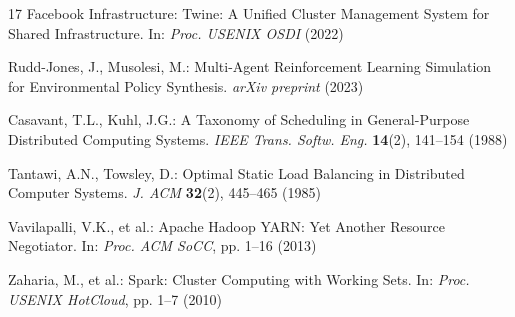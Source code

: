 \documentclass[runningheads]{llncs}
\begin{document}
\begin{thebibliography}{17}
Facebook Infrastructure: Twine: A Unified Cluster Management System for Shared Infrastructure. In: \emph{Proc. USENIX OSDI} (2022)

Rudd-Jones, J., Musolesi, M.: Multi-Agent Reinforcement Learning Simulation for Environmental Policy Synthesis. \emph{arXiv preprint} (2023)

Casavant, T.L., Kuhl, J.G.: A Taxonomy of Scheduling in General-Purpose Distributed Computing Systems. \emph{IEEE Trans. Softw. Eng.} \textbf{14}(2), 141--154 (1988)

Tantawi, A.N., Towsley, D.: Optimal Static Load Balancing in Distributed Computer Systems. \emph{J. ACM} \textbf{32}(2), 445--465 (1985)

Vavilapalli, V.K., et al.: Apache Hadoop YARN: Yet Another Resource Negotiator. In: \emph{Proc. ACM SoCC}, pp. 1--16 (2013)

Zaharia, M., et al.: Spark: Cluster Computing with Working Sets. In: \emph{Proc. USENIX HotCloud}, pp. 1--7 (2010)
\end{thebibliography}
\end{document}

